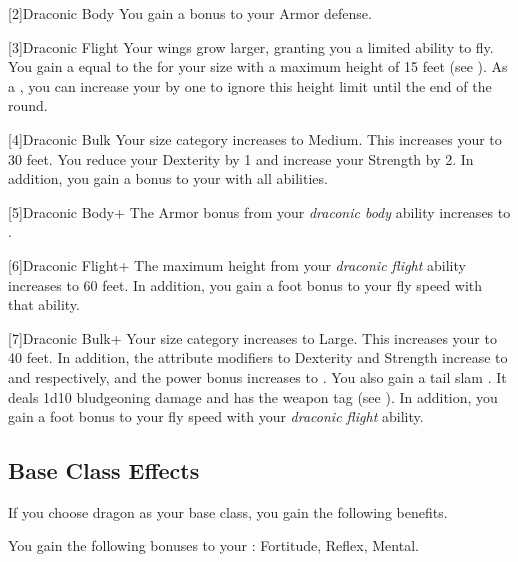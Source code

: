         [2]{Draconic Body} You gain a  bonus to your Armor defense.

        [3]{Draconic Flight} Your wings grow larger, granting you a limited ability to fly.
        You gain a  equal to the  for your size with a maximum height of 15 feet (see ).
        As a , you can increase your  by one to ignore this height limit until the end of the round.

        [4]{Draconic Bulk} Your size category increases to Medium.
        This increases your  to 30 feet.
        You reduce your Dexterity by 1 and increase your Strength by 2.
        In addition, you gain a  bonus to your  with all abilities.

        [5]{Draconic Body+} The Armor bonus from your \textit{draconic body} ability increases to .

        [6]{Draconic Flight+} The maximum height from your \textit{draconic flight} ability increases to 60 feet.
        In addition, you gain a  foot bonus to your fly speed with that ability.

        [7]{Draconic Bulk+} Your size category increases to Large.
        This increases your  to 40 feet.
        In addition, the attribute modifiers to Dexterity and Strength increase to  and  respectively, and the power bonus increases to .
        You also gain a tail slam .
        It deals 1d10 bludgeoning damage and has the  weapon tag (see ).
        In addition, you gain a  foot bonus to your fly speed with your \textit{draconic flight} ability.

    \subsection{Base Class Effects}
        If you choose dragon as your base class, you gain the following benefits.

        You gain the following bonuses to your :  Fortitude,  Reflex,  Mental.

